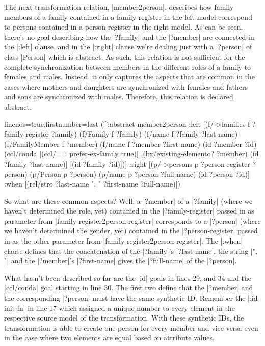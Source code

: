 \documentclass[a4paper]{article}
\newcommand{\code}{\clojureinline}
\begin{document}
The next transformation relation, \code|member2person|, describes how family
members of a family contained in a family register in the left model correspond
to persons contained in a person register in the right model.  As can be seen,
there's no goal describing how the \code|?family| and the \code|?member| are
connected in the \code|:left| clause, and in the \code|:right| clause we're
dealing just with a \code|?person| of class \code|Person| which is abstract.
As such, this relation is not sufficient for the complete synchronization
between members in the different roles of a family to females and males.
Instead, it only captures the aspects that are common in the cases where
mothers and daughters are synchronized with females and fathers and sons are
synchronized with males.  Therefore, this relation is declared abstract.

\begin{clojurecode*}{linenos=true,firstnumber=last}
  (^:abstract member2person
   :left  [(f/->families f ?family-register ?family)
           (f/Family f ?family)
           (f/name f ?family ?last-name)
           (f/FamilyMember f ?member)
           (f/name f ?member ?first-name)
           (id ?member ?id)
           (ccl/conda
            [(ccl/== prefer-ex-family true)]
            [(bx/existing-elemento? ?member)
             (id ?family ?last-name)]
            [(id ?family ?id)])]
   :right [(p/->persons p ?person-register ?person)
           (p/Person p ?person)
           (p/name p ?person ?full-name)
           (id ?person ?id)]
   :when  [(rel/stro ?last-name ", " ?first-name ?full-name)])
\end{clojurecode*}

So what are these common aspects?  Well, a \code|?member| of a \code|?family|
(where we haven't determined the role, yet) contained in the
\code|?family-register| passed in as parameter from
\code|family-register2person-register| corresponds to a \code|?person| (where
we haven't determined the gender, yet) contained in the \code|?person-register|
passed in as the other parameter from \code|family-register2person-register|.
The \code|:when| clause defines that the concatenation of the \code|?family|'s
\code|?last-name|, the string \code|", "| and the \code|?member|'s
\code|?first-name| gives the \code|?full-name| of the \code|?person|.

What hasn't been described so far are the \code|id| goals in lines 29, and 34
and the \code|ccl/conda| goal starting in line 30.  The first two define that
the \code|?member| and the corresponding \code|?person| must have the same
synthetic ID.  Remember the \code|:id-init-fn| in line 17 which assigned a
unique number to every element in the respective source model of the
transformation.  With these synthetic IDs, the transformation is able to create
one person for every member and vice versa even in the case where two elements
are equal based on attribute values.
\end{document}
